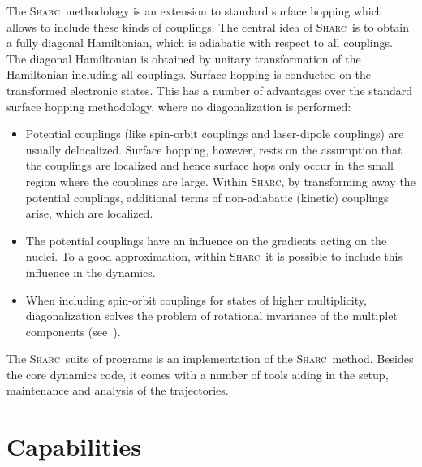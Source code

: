 \documentclass[a4paper,11pt,DIV=15,openany,twoside=false]{scrbook}
\newcommand{\sharc}{\textsc{Sharc}}
\begin{document}
The \sharc\ methodology is an extension to standard surface hopping which allows to include these kinds of couplings. The central idea of \sharc\ is to obtain a fully diagonal Hamiltonian, which is adiabatic with respect to all couplings. The diagonal Hamiltonian is obtained by unitary transformation of the Hamiltonian including all couplings. Surface hopping is conducted on the transformed electronic states.
This has a number of advantages over the standard surface hopping methodology, where no diagonalization is performed:
\begin{itemize}
  \item Potential couplings (like spin-orbit couplings and laser-dipole couplings) are usually delocalized. Surface hopping, however, rests on the assumption that the couplings are localized and hence surface hops only occur in the small region where the couplings are large. Within \sharc, by transforming away the potential couplings, additional terms of non-adiabatic (kinetic) couplings arise, which are localized. 
  \item The potential couplings have an influence on the gradients acting on the nuclei. To a good approximation, within \sharc\ it is possible to include this influence in the dynamics.
  \item When including spin-orbit couplings for states of higher multiplicity, diagonalization solves the problem of rotational invariance of the multiplet components (see~\cite{Granucci2012JCP}). 
\end{itemize}

The \sharc\ suite of programs is an implementation of the \sharc\ method. Besides the core dynamics code, it comes with a number of tools aiding in the setup, maintenance and analysis of the trajectories. 

\section{Capabilities}
\end{document}
